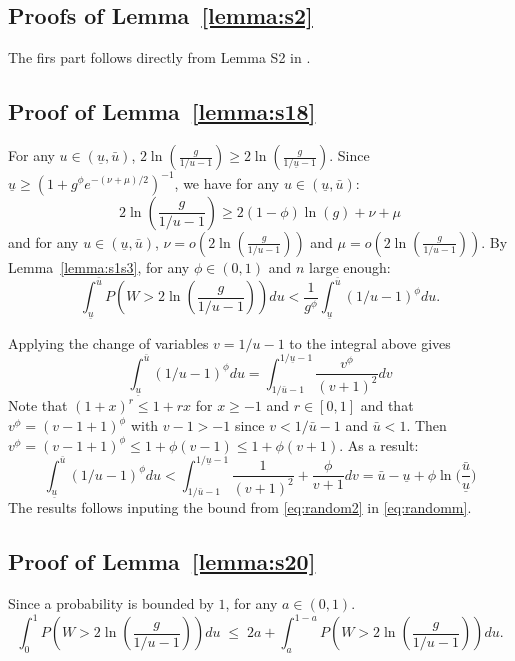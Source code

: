 \documentclass[aos]{imsart}
\theoremstyle{plain}
\begin{document}
\subsection{Proofs of Lemma~\ref{lemma:s2}}
The firs part follows directly from Lemma S2 in \cite{rossell2022concentration}.

\subsection{Proof of Lemma~\ref{lemma:s18}}
For any $u\in (\underline{u},\bar{u})$, $2\ln \left(\frac{g}{1 / u-1}\right) \geq 2\ln \left(\frac{g}{1 / \underline{u}-1}\right)$. Since $\underline{u}\geq (1+g^{\phi}e^{-(\nu+\mu)/2})^{-1}$,  we have for any $u\in (\underline{u},\bar{u})$:
$$2\ln \left(\frac{g}{1 / u-1}\right) \geq 2(1-\phi)\ln(g)+\nu+\mu $$
and for any $u\in (\underline{u},\bar{u})$, $\nu=o\left(2\ln \left(\frac{g}{1 / u-1}\right)\right)$ and $\mu=o\left(2\ln \left(\frac{g}{1 / u-1}\right)\right)$. By Lemma~\ref{lemma:s1s3}, for any $\phi\in(0,1)$ and $n$ large enough:
\begin{equation}\label{eq:randomm}
    \int_{\underline{u}}^{\bar{u}} P\left(W>2\ln \left(\frac{g}{1 / u-1}\right)\right) d u< \frac{1}{g^{\phi}} \int_{\underline{u}}^{\bar{u}}(1 / u-1)^{\phi} d u .
\end{equation}

Applying the change of variables $v=1 / u-1$ to the integral above gives
$$
\int_{\underline{u}}^{\bar{u}}(1 / u-1)^{\phi} d u=\int_{1 / \bar{u}-1}^{1 / \underline{u}-1} \frac{v^{\phi}}{(v+1)^2} d v
$$
Note that $(1+x)^r \leq 1+r x$  for $x \geq-1$ and $r\in[0,1]$ and that $v^{\phi}=(v-1 + 1)^{\phi}$ with $v-1>-1$ since $v<1 / \bar{u}-1$ and $\bar{u}<1$. Then $v^{\phi}=(v-1 + 1)^{\phi}\leq 1 + \phi (v-1)\leq 1 + \phi(v+1)$. As a result:
\begin{equation}\label{eq:random2}
\int_{\underline{u}}^{\bar{u}}(1 / u-1)^{\phi} d u<\int_{1 / \bar{u}-1}^{1 / \underline{u}-1} \frac{1}{(v+1)^2} +\frac{\phi}{v+1} d v = \bar{u}-\underline{u}+\phi\ln\Big(\frac{\bar{u}}{\underline{u}}\Big)
\end{equation}
The results follows inputing the bound from \eqref{eq:random2} in \eqref{eq:randomm}.


\subsection{Proof of Lemma~\ref{lemma:s20}}
Since a probability is bounded by $1$, for any $a\in(0,1)$.
\begin{equation}\label{eq:basebound}
    \int_0^1 P\left(W>2 \ln \left(\frac{g}{1 / u-1}\right)\right) d u \;\leq\; 2 a+\int_{a}^{1-a} P\left(W>2\ln\left(\frac{g}{1 / u-1}\right)\right) d u.
\end{equation}
\end{document}
